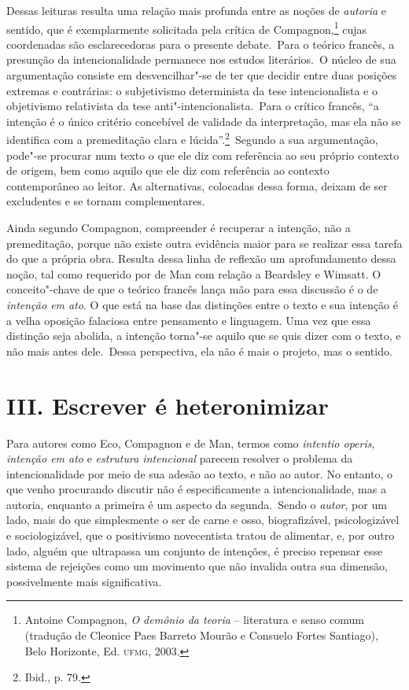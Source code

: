 Dessas leituras resulta uma relação mais profunda entre as noções
de \emph{autoria} e sentido, que é exemplarmente solicitada pela crítica
de Compagnon,\footnote{Antoine Compagnon, \emph{O demônio da
  teoria} -- literatura e senso comum (tradução de Cleonice Paes
  Barreto Mourão e Consuelo Fortes Santiago), Belo Horizonte, Ed.
  \textsc{ufmg}, 2003.} cujas coordenadas são esclarecedoras para o
presente debate.~Para o teórico francês, a presunção da intencionalidade
permanece nos estudos literários.~O núcleo de sua argumentação consiste
em desvencilhar"-se de ter que decidir entre duas posições extremas e
contrárias: o subjetivismo determinista da tese intencionalista e o
objetivismo relativista da tese anti"-intencionalista.~Para o crítico francês,
``a intenção é o único critério concebível de validade da interpretação,
mas ela não se identifica com a premeditação clara e lúcida''.\footnote{Ibid.,
  p. 79.}~Segundo a sua argumentação, pode"-se procurar num texto o que ele diz com referência ao seu próprio contexto de origem, bem como aquilo que ele diz com referência ao contexto contemporâneo ao leitor. As
alternativas, colocadas dessa forma, deixam de ser excludentes e se
tornam complementares.

Ainda segundo Compagnon, compreender é recuperar a intenção, não a
premeditação, porque não existe outra evidência maior para se realizar
essa tarefa do que a própria obra. Resulta dessa linha de reflexão um
aprofundamento dessa noção, tal como requerido por de Man com relação a
Beardsley e Wimsatt. O conceito"-chave de que o teórico francês lança mão
para essa discussão é o de \emph{intenção em ato}. O que está na base
das distinções entre o texto e sua intenção é a velha oposição falaciosa
entre pensamento e linguagem. Uma vez que essa distinção seja abolida, a
intenção torna"-se aquilo que se quis dizer com o texto, e não mais antes
dele.~Dessa perspectiva, ela não é mais o projeto, mas o sentido.

\section*{III. Escrever é heteronimizar}


Para autores como Eco, Compagnon e de Man, termos como \emph{intentio
operis}, \emph{intenção em ato} e \emph{estrutura intencional} parecem
resolver o problema da intencionalidade por meio de sua adesão ao texto,
e não ao autor. No entanto, o que venho procurando discutir não é
especificamente a intencionalidade, mas a autoria, enquanto a primeira é um
aspecto da segunda.~Sendo o \emph{autor}, por um lado, mais do que
simplesmente o ser de carne e osso, biografizável, psicologizável e
sociologizável, que o positivismo novecentista tratou de alimentar, e,
por outro lado, alguém que ultrapassa um conjunto de intenções, é
preciso repensar esse sistema de rejeições como um movimento que não
invalida outra sua dimensão, possivelmente mais significativa.


